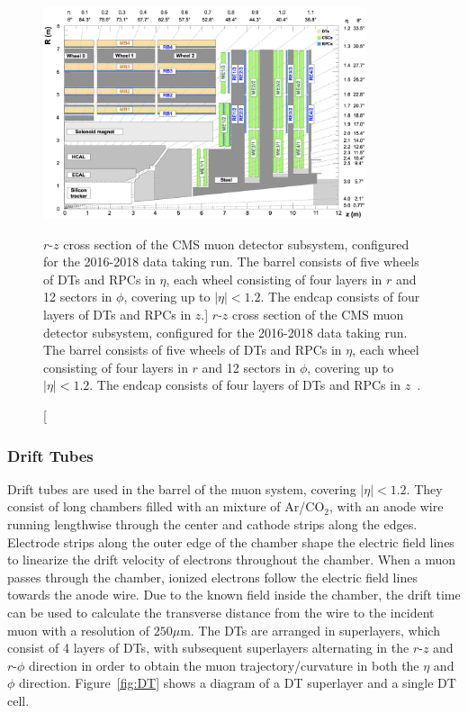 \begin{figure}[htpb]
	\centering
	\includegraphics[width=0.85\textwidth]{figs/03_experiment/Muon_system.png}
	\caption
	[$r$-$z$ cross section of the CMS muon detector subsystem, configured for the 2016-2018 data taking run. The barrel consists of five wheels of DTs and RPCs in $\eta$, each wheel consisting of four layers in $r$ and 12 sectors in $\phi$, covering up to $\left|\eta\right| < 1.2$. The endcap consists of four layers of DTs and RPCs in $z$.]
	{$r$-$z$ cross section of the CMS muon detector subsystem, configured for the 2016-2018 data taking run. The barrel consists of five wheels of DTs and RPCs in $\eta$, each wheel consisting of four layers in $r$ and 12 sectors in $\phi$, covering up to $\left|\eta\right| < 1.2$. The endcap consists of four layers of DTs and RPCs in $z$~\cite{Sirunyan:2313130}.}
	\label{fig:Muons}
\end{figure}

\subsubsection{Drift Tubes} \label{sec:CMS_DT}
Drift tubes are used in the barrel of the muon system, covering $\left|\eta\right| < 1.2$. They consist of long chambers filled with an mixture of Ar/$\text{CO}_2$, with an anode wire running lengthwise through the center and cathode strips along the edges. Electrode strips along the outer edge of the chamber shape the electric field lines to linearize the drift velocity of electrons throughout the chamber. When a muon passes through the chamber, ionized electrons follow the electric field lines towards the anode wire. Due to the known field inside the chamber, the drift time can be used to calculate the transverse distance from the wire to the incident muon with a resolution of $250\unit{\mu\m}$. The DTs are arranged in superlayers, which consist of 4 layers of DTs, with subsequent superlayers alternating in the $r$-$z$ and $r$-$\phi$ direction in order to obtain the muon trajectory/curvature in both the $\eta$ and $\phi$ direction. Figure~\ref{fig:DT} shows a diagram of a DT superlayer and a single DT cell.


